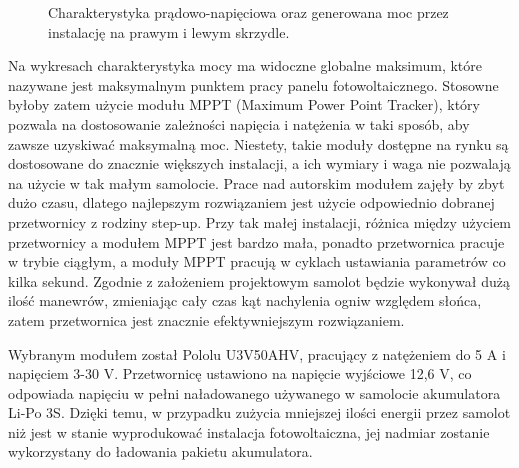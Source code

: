 \documentclass[12pt, a4paper]{article}
\begin{document}
\begin{figure}[ht]
    \centering
    \qquad
    \caption{Charakterystyka prądowo-napięciowa oraz generowana moc przez instalację na prawym i lewym skrzydle.}
    \label{fig:charakterystyki}
\end{figure}

Na wykresach charakterystyka mocy ma widoczne globalne maksimum, które nazywane jest maksymalnym punktem pracy panelu fotowoltaicznego. Stosowne byłoby zatem użycie modułu MPPT (Maximum Power Point Tracker), który pozwala na dostosowanie zależności napięcia i natężenia w taki sposób, aby zawsze uzyskiwać maksymalną moc. Niestety, takie moduły dostępne na rynku są dostosowane do znacznie większych instalacji, a ich wymiary i waga nie pozwalają na użycie w tak małym samolocie. Prace nad autorskim modułem zajęły by zbyt dużo czasu, dlatego najlepszym rozwiązaniem jest użycie odpowiednio dobranej przetwornicy z rodziny step-up. Przy tak małej instalacji, różnica między użyciem przetwornicy a modułem MPPT jest bardzo mała, ponadto przetwornica pracuje w trybie ciągłym, a moduły MPPT pracują w cyklach ustawiania parametrów co kilka sekund. Zgodnie z założeniem projektowym samolot będzie wykonywał dużą ilość manewrów, zmieniając cały czas kąt nachylenia ogniw względem słońca, zatem przetwornica jest znacznie efektywniejszym rozwiązaniem.

Wybranym modułem został Pololu U3V50AHV, pracujący z natężeniem do 5 A i napięciem 3-30 V. Przetwornicę ustawiono na napięcie wyjściowe 12,6 V, co odpowiada napięciu w pełni naładowanego używanego w samolocie akumulatora Li-Po 3S. Dzięki temu, w przypadku zużycia mniejszej ilości energii przez samolot niż jest w stanie wyprodukować instalacja fotowoltaiczna, jej nadmiar zostanie wykorzystany do ładowania pakietu akumulatora.
\end{document}
